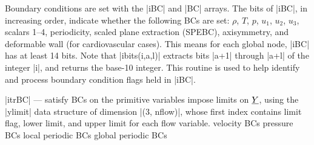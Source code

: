 \documentclass[11pt]{article}
\begin{document}
Boundary conditions are set with the |iBC| and |BC| arrays. The bits of |iBC|, in increasing order, indicate whether the following BCs are set: $\rho$, $T$, $p$, $u_1$, $u_2$, $u_3$, scalars 1--4, periodicity, scaled plane extraction (SPEBC), axisymmetry, and deformable wall (for cardiovascular cases). This means for each global node, |iBC| has at least 14 bits. Note that |ibits(i,a,l)| extracts bits |a+1| through |a+l| of the integer |i|, and returns the base-10 integer. This routine is used to help identify and process boundary condition flags held in |iBC|.
\begin{outline}[deep]
\1 |itrBC| --- satisfy BCs on the primitive variables
	\2 impose limits on $\underline{Y}$, using the |ylimit| data structure of dimension |(3, nflow)|, whose first index contains limit flag, lower limit, and upper limit for each flow variable.
	\2 velocity BCs
		\3 
	\2 pressure BCs
		\3 
	\2 local periodic BCs
	\2 global periodic BCs
\end{outline}
\end{document}
